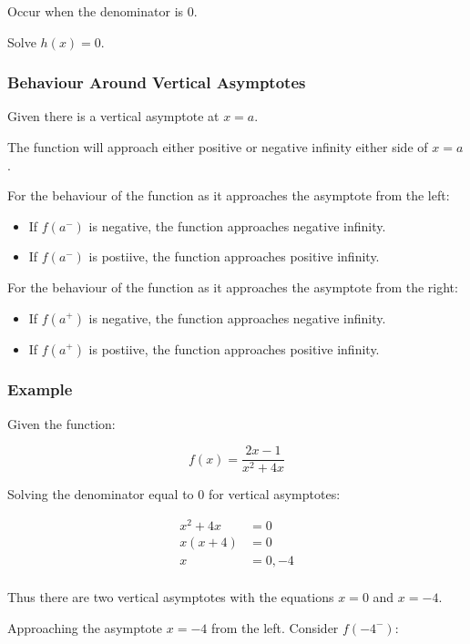 \documentclass[a4paper,11pt]{article}
\begin{document}
Occur when the denominator is 0.

Solve $h(x) = 0$.


\subsubsection{Behaviour Around Vertical Asymptotes}

Given there is a vertical asymptote at $x = a$.

The function will approach either positive or negative infinity either side of
$x = a$.

For the behaviour of the function as it approaches the asymptote from the left:

\begin{itemize}
\item If $f(a^-)$ is negative, the function approaches negative infinity.
\item If $f(a^-)$ is postiive, the function approaches positive infinity.
\end{itemize}

For the behaviour of the function as it approaches the asymptote from the right:

\begin{itemize}
\item If $f(a^+)$ is negative, the function approaches negative infinity.
\item If $f(a^+)$ is postiive, the function approaches positive infinity.
\end{itemize}


\subsubsection{Example}

Given the function:

$$
f(x) = \frac{2x - 1}{x^2 + 4x}
$$

Solving the denominator equal to 0 for vertical asymptotes:

$$
\begin{aligned}
x^2 + 4x & = 0 \\
x(x + 4) & = 0 \\
x & = 0, -4 \\
\end{aligned}
$$

Thus there are two vertical asymptotes with the equations $x = 0$ and $x = -4$.

Approaching the asymptote $x = -4$ from the left. Consider $f(-4^-)$:
\end{document}
